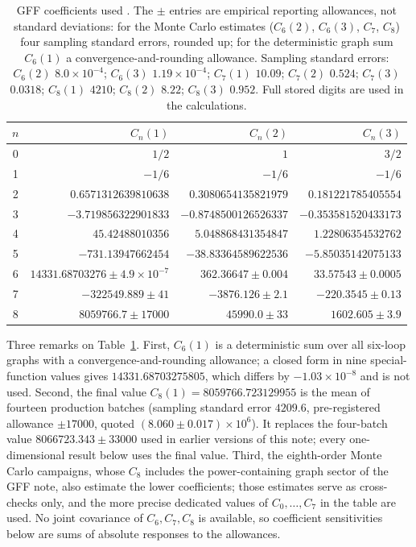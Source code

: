 \documentclass[11pt,a4paper]{article}
\numberwithin{equation}{section}
\newcommand{\sci}[2]{#1\times10^{#2}}
\begin{document}
\begin{table}[htbp]\centering\small
\begin{tabular}{@{}c r r r@{}}
\toprule
$n$ & $C_n(1)$ & $C_n(2)$ & $C_n(3)$\\ \midrule
0 & $1/2$ & $1$ & $3/2$\\
1 & $-1/6$ & $-1/6$ & $-1/6$\\
2 & $0.6571312639810638$ & $0.3080654135821979$ & $0.181221785405554$\\
3 & $-3.719856322901833$ & $-0.8748500126526337$ & $-0.353581520433173$\\
4 & $45.42488010356$ & $5.048868431354847$ & $1.22806354532762$\\
5 & $-731.13947662454$ & $-38.83364589622536$ & $-5.85035142075133$\\
6 & $14331.68703276\pm\sci{4.9}{-7}$ & $362.36647\pm0.004$ & $33.57543\pm0.0005$\\
7 & $-322549.889\pm41$ & $-3876.126\pm2.1$ & $-220.3545\pm0.13$\\
8 & $8059766.7\pm17000$ & $45990.0\pm33$ & $1602.605\pm3.9$\\
\bottomrule
\end{tabular}
\caption{GFF coefficients used \cite{noteGFF}. The $\pm$ entries are empirical reporting
allowances, not standard deviations: for the Monte Carlo estimates ($C_6(2)$, $C_6(3)$, $C_7$,
$C_8$) four sampling standard errors, rounded up; for the deterministic graph sum $C_6(1)$ a
convergence-and-rounding allowance. Sampling standard errors: $C_6(2)$ $\sci{8.0}{-4}$;
$C_6(3)$ $\sci{1.19}{-4}$; $C_7(1)$ $10.09$; $C_7(2)$ $0.524$; $C_7(3)$ $0.0318$; $C_8(1)$
$4210$; $C_8(2)$ $8.22$; $C_8(3)$ $0.952$. Full stored digits are used in the calculations.}
\label{tab:coefficients}
\end{table}

Three remarks on Table~\ref{tab:coefficients}. First, $C_6(1)$ is a deterministic sum
over all six-loop graphs with a convergence-and-rounding allowance; a closed form in nine
special-function values gives $14331.68703275805$, which differs by $\sci{-1.03}{-8}$ and
is not used. Second, the final value $C_8(1)=8059766.723129955$ is the mean of fourteen
production batches (sampling standard error $4209.6$, pre-registered allowance
$\pm17000$, quoted $(8.060\pm0.017)\times10^6$). It replaces the four-batch value
$8066723.343\pm33000$ used in earlier versions of this note; every one-dimensional result below uses
the final value. Third, the eighth-order Monte Carlo campaigns, whose $C_8$ includes the
power-containing graph sector of the GFF note, also estimate the lower coefficients; those
estimates serve as cross-checks only, and the more precise dedicated values of
$C_0,\dots,C_7$ in the table are used. No joint covariance of
$C_6,C_7,C_8$ is available, so coefficient sensitivities below are sums of absolute
responses to the allowances.
\end{document}
